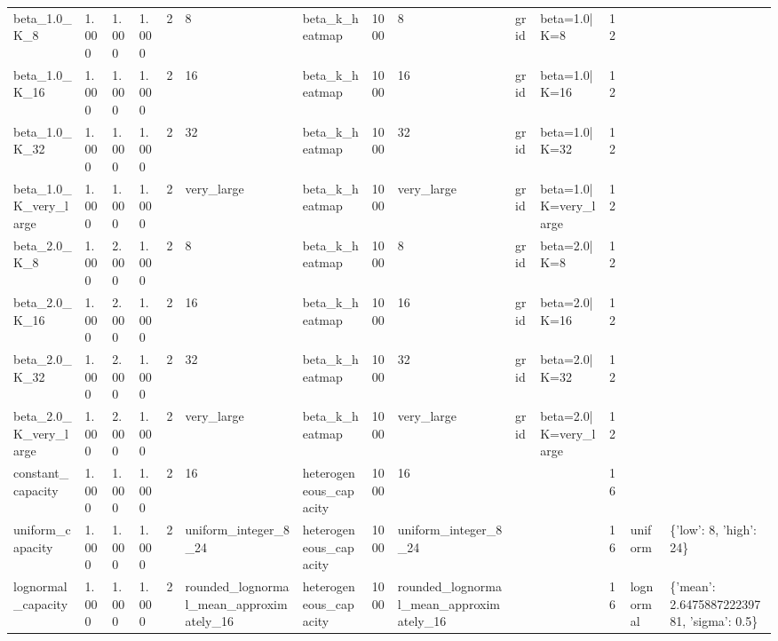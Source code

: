 \begin{tabular}{llllllllllllll}
beta\_1.0\_K\_8 & 1.000 & 1.000 & 1.000 & 2 & 8 & beta\_k\_heatmap & 1000 & 8 & grid & beta=1.0|K=8 & 12 &  &  \\
beta\_1.0\_K\_16 & 1.000 & 1.000 & 1.000 & 2 & 16 & beta\_k\_heatmap & 1000 & 16 & grid & beta=1.0|K=16 & 12 &  &  \\
beta\_1.0\_K\_32 & 1.000 & 1.000 & 1.000 & 2 & 32 & beta\_k\_heatmap & 1000 & 32 & grid & beta=1.0|K=32 & 12 &  &  \\
beta\_1.0\_K\_very\_large & 1.000 & 1.000 & 1.000 & 2 & very\_large & beta\_k\_heatmap & 1000 & very\_large & grid & beta=1.0|K=very\_large & 12 &  &  \\
beta\_2.0\_K\_8 & 1.000 & 2.000 & 1.000 & 2 & 8 & beta\_k\_heatmap & 1000 & 8 & grid & beta=2.0|K=8 & 12 &  &  \\
beta\_2.0\_K\_16 & 1.000 & 2.000 & 1.000 & 2 & 16 & beta\_k\_heatmap & 1000 & 16 & grid & beta=2.0|K=16 & 12 &  &  \\
beta\_2.0\_K\_32 & 1.000 & 2.000 & 1.000 & 2 & 32 & beta\_k\_heatmap & 1000 & 32 & grid & beta=2.0|K=32 & 12 &  &  \\
beta\_2.0\_K\_very\_large & 1.000 & 2.000 & 1.000 & 2 & very\_large & beta\_k\_heatmap & 1000 & very\_large & grid & beta=2.0|K=very\_large & 12 &  &  \\
constant\_capacity & 1.000 & 1.000 & 1.000 & 2 & 16 & heterogeneous\_capacity & 1000 & 16 &  &  & 16 &  &  \\
uniform\_capacity & 1.000 & 1.000 & 1.000 & 2 & uniform\_integer\_8\_24 & heterogeneous\_capacity & 1000 & uniform\_integer\_8\_24 &  &  & 16 & uniform & \{'low': 8, 'high': 24\} \\
lognormal\_capacity & 1.000 & 1.000 & 1.000 & 2 & rounded\_lognormal\_mean\_approximately\_16 & heterogeneous\_capacity & 1000 & rounded\_lognormal\_mean\_approximately\_16 &  &  & 16 & lognormal & \{'mean': 2.647588722239781, 'sigma': 0.5\} \\
\bottomrule
\end{tabular}
